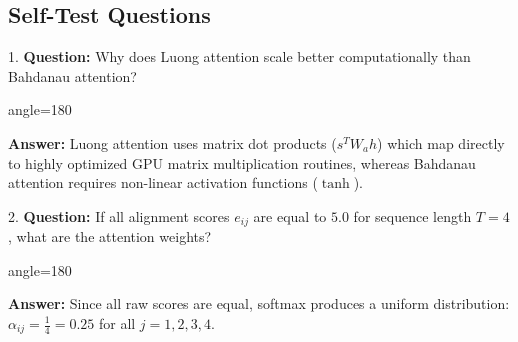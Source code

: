 \documentclass[a4paper,11pt]{article}
\newcommand{\flipanswer}[1]{%
  \begin{adjustbox}{angle=180}%
    \begin{minipage}{\linewidth}%
      \small\color{mutedtext}#1%
    \end{minipage}%
  \end{adjustbox}%
}
\begin{document}
\subsection*{Self-Test Questions}
1. \textbf{Question:} Why does Luong attention scale better computationally than Bahdanau attention?\\
\flipanswer{\textbf{Answer:} Luong attention uses matrix dot products ($s^T W_a h$) which map directly to highly optimized GPU matrix multiplication routines, whereas Bahdanau attention requires non-linear activation functions ($\tanh$).}

\vspace{10pt}

2. \textbf{Question:} If all alignment scores $e_{ij}$ are equal to $5.0$ for sequence length $T=4$, what are the attention weights?\\
\flipanswer{\textbf{Answer:} Since all raw scores are equal, softmax produces a uniform distribution: $\alpha_{ij} = \frac{1}{4} = 0.25$ for all $j=1,2,3,4$.}
\end{document}

